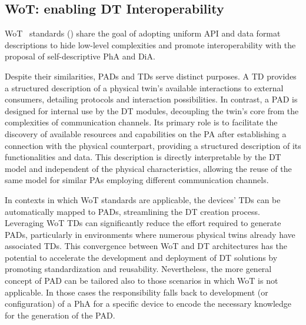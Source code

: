 
\subsection{\acl{WoT}: enabling DT Interoperability}
\label{sec:wot-dt-interop}

\ac{WoT}~\cite{wot-arch} standards () share the goal of adopting uniform API and data format descriptions to hide low-level complexities and promote interoperability with the proposal of self-descriptive \ac{PhA} and \ac{DiA}.

Despite their similarities, \acp{PAD} and \acp{TD} serve distinct purposes. 
A \ac{TD} provides a structured description of a physical twin's available interactions to external consumers, detailing protocols and interaction possibilities.
%
In contrast, a \ac{PAD} is designed for internal use by the \ac{DT} modules, decoupling the twin's core from the complexities of communication channels.
Its primary role is to facilitate the discovery of available resources and capabilities on the \ac{PA} after establishing a connection with the physical counterpart, providing a structured description of its functionalities and data.
This description is directly interpretable by the \ac{DT} model and independent of the physical characteristics, allowing the reuse of the same model for similar \acp{PA} employing different communication channels.

In contexts in which \ac{WoT} standards are applicable, the devices' \acp{TD} can be automatically mapped to \acp{PAD}, streamlining the \ac{DT} creation process.
Leveraging \ac{WoT} \acp{TD} can significantly reduce the effort required to generate \acp{PAD}, particularly in environments where numerous physical twins already have associated \acp{TD}.
This convergence between \ac{WoT} and \ac{DT} architectures has the potential to accelerate the development and deployment of \ac{DT} solutions by promoting standardization and reusability.
%
Nevertheless, the more general concept of \ac{PAD} can be tailored also to those scenarios in which \ac{WoT} is not applicable. In those cases the responsibility falls back to development (or configuration) of a \ac{PhA} for a specific device to encode the necessary knowledge for the generation of the \ac{PAD}.

